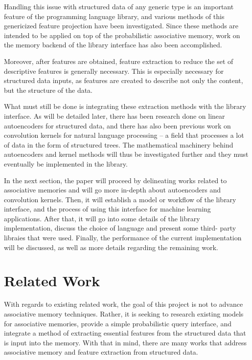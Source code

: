 \documentclass{sig-alternate}
\begin{document}
Handling this issue with structured data of any generic type is an important feature of the 
programming language library, and various methods of this genericized feature projection have been 
investigated. Since these methods are intended to be applied on top of the probabilistic
associative memory, work on the memory backend of the library interface has also been accomplished.

Moreover, after features are obtained, feature extraction to reduce the set of descriptive
features is generally necessary. This is especially necessary for structured data 
inputs, as features are created to describe not only the content, but the structure of the data.

What must still be done is integrating these extraction methods with the library interface.
As will be detailed later, there has been research done on linear autoencoders
for structured data, and there has also been previous work on convolution 
kernels for natural language processing -- a field that processes a lot of 
data in the form of structured trees. The mathematical machinery behind autoencoders and kernel 
methods will thus be investigated further and they must eventually be implemented in the library.

In the next section, the paper will proceed by delineating works related to 
associative memories and will go more in-depth about autoencoders 
and convolution kernels. Then, it will establish a model or workflow of the 
library interface, and the process of using this interface for machine
learning applications. After that, it will go into some details of the library
implementation, discuss the choice of language and present some third-
party libraies that were used. Finally, the performance of the current
implementation will be discussed, as well as more details regarding the remaining work.

\section{Related Work}
\label{sec:related_work}

With regards to existing related work, the goal of this project is not to advance associative memory 
techniques. Rather, it is seeking to research existing models for associative memories, provide a 
simple probabilistic query interface, and integrate a method of extracting essential features from 
the structured data that is input into the memory. With that in mind, there are many works that 
address associative memory and feature extraction from structured data.
\end{document}

